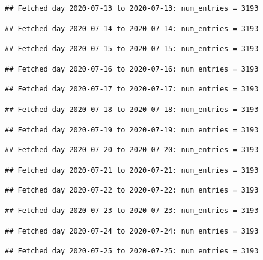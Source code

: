 \documentclass[]{article}
\begin{document}
\begin{verbatim}
## Fetched day 2020-07-13 to 2020-07-13: num_entries = 3193
\end{verbatim}

\begin{verbatim}
## Fetched day 2020-07-14 to 2020-07-14: num_entries = 3193
\end{verbatim}

\begin{verbatim}
## Fetched day 2020-07-15 to 2020-07-15: num_entries = 3193
\end{verbatim}

\begin{verbatim}
## Fetched day 2020-07-16 to 2020-07-16: num_entries = 3193
\end{verbatim}

\begin{verbatim}
## Fetched day 2020-07-17 to 2020-07-17: num_entries = 3193
\end{verbatim}

\begin{verbatim}
## Fetched day 2020-07-18 to 2020-07-18: num_entries = 3193
\end{verbatim}

\begin{verbatim}
## Fetched day 2020-07-19 to 2020-07-19: num_entries = 3193
\end{verbatim}

\begin{verbatim}
## Fetched day 2020-07-20 to 2020-07-20: num_entries = 3193
\end{verbatim}

\begin{verbatim}
## Fetched day 2020-07-21 to 2020-07-21: num_entries = 3193
\end{verbatim}

\begin{verbatim}
## Fetched day 2020-07-22 to 2020-07-22: num_entries = 3193
\end{verbatim}

\begin{verbatim}
## Fetched day 2020-07-23 to 2020-07-23: num_entries = 3193
\end{verbatim}

\begin{verbatim}
## Fetched day 2020-07-24 to 2020-07-24: num_entries = 3193
\end{verbatim}

\begin{verbatim}
## Fetched day 2020-07-25 to 2020-07-25: num_entries = 3193
\end{verbatim}
\end{document}
